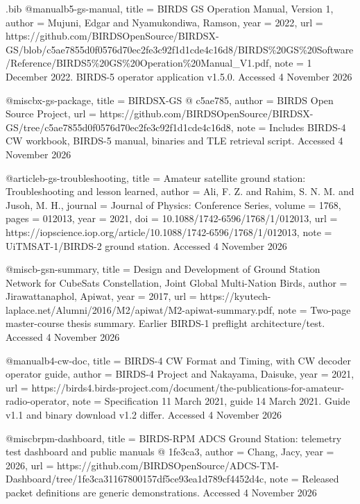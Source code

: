 \begin{filecontents*}[overwrite]{\jobname.bib}
@manual{b5-gs-manual,
  title = {{BIRDS GS Operation Manual, Version 1}},
  author = {Mujuni, Edgar and Nyamukondiwa, Ramson},
  year = {2022},
  url = {https://github.com/BIRDSOpenSource/BIRDSX-GS/blob/c5ae7855d0f0576d70ec2fe3c92f1d1cde4c16d8/BIRDS\%20GS\%20Software/Reference/BIRDS5\%20GS\%20Operation\%20Manual_V1.pdf},
  note = {1 December 2022. BIRDS-5 operator application v1.5.0. Accessed 4 November 2026}
}

@misc{bx-gs-package,
  title = {{BIRDSX-\allowbreak{}GS @ c5ae785}},
  author = {{BIRDS Open Source Project}},
  url = {https://github.com/BIRDSOpenSource/BIRDSX-GS/tree/c5ae7855d0f0576d70ec2fe3c92f1d1cde4c16d8},
  note = {Includes BIRDS-4 CW workbook, BIRDS-5 manual, binaries and TLE retrieval script. Accessed 4 November 2026}
}

@article{b-gs-troubleshooting,
  title = {{Amateur satellite ground station: Troubleshooting and lesson learned}},
  author = {Ali, F. Z. and Rahim, S. N. M. and Jusoh, M. H.},
  journal = {Journal of Physics: Conference Series},
  volume = {1768},
  pages = {012013},
  year = {2021},
  doi = {10.1088/1742-6596/1768/1/012013},
  url = {https://iopscience.iop.org/article/10.1088/1742-6596/1768/1/012013},
  note = {UiTMSAT-1/BIRDS-2 ground station. Accessed 4 November 2026}
}

@misc{b-gsn-summary,
  title = {{Design and Development of Ground Station Network for CubeSats Constellation, Joint Global Multi-Nation Birds}},
  author = {Jirawattanaphol, Apiwat},
  year = {2017},
  url = {https://kyutech-laplace.net/Alumni/2016/M2/apiwat/M2-apiwat-summary.pdf},
  note = {Two-page master-course thesis summary. Earlier BIRDS-1 preflight architecture/test. Accessed 4 November 2026}
}

@manual{b4-cw-doc,
  title = {{BIRDS-4 CW Format and Timing, with CW decoder operator guide}},
  author = {{BIRDS-4 Project} and Nakayama, Daisuke},
  year = {2021},
  url = {https://birds4.birds-project.com/document/the-publications-for-amateur-radio-operator},
  note = {Specification 11 March 2021, guide 14 March 2021. Guide v1.1 and binary download v1.2 differ. Accessed 4 November 2026}
}

@misc{brpm-dashboard,
  title = {{BIRDS-RPM ADCS Ground Station: telemetry test dashboard and public manuals @ 1fe3ca3}},
  author = {Chang, Jacy},
  year = {2026},
  url = {https://github.com/BIRDSOpenSource/ADCS-TM-Dashboard/tree/1fe3ca31167800157df5ce93ea1d789cf4452d4c},
  note = {Released packet definitions are generic demonstrations. Accessed 4 November 2026}
}
\end{filecontents*}
